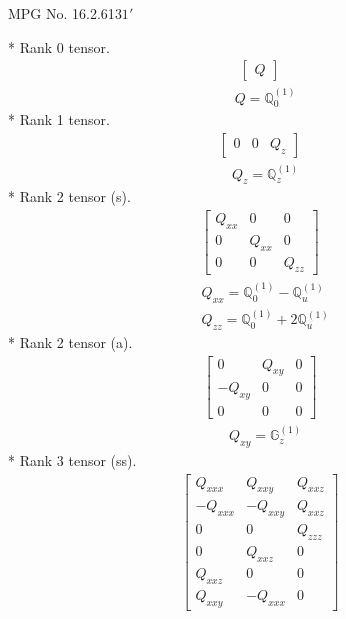\documentclass[fleqn,8pt,landscape]{jsarticle}
\begin{document}
\setcounter{MaxMatrixCols}{32}

\renewcommand{\tablename}{Table~}
\renewcommand{\figurename}{Figure~}
\begin{center}
\LARGE
MPG No. 16.2.61\quad$31'$
\end{center}
* Rank 0 tensor.
\begin{align*}
\begin{bmatrix} Q \end{bmatrix}
\end{align*}
\begin{align*}
& Q = \mathbb{Q}_{0}^{(1)}
\end{align*}
* Rank 1 tensor.
\begin{align*}
\begin{bmatrix} 0 & 0 & Q_{z} \end{bmatrix}
\end{align*}
\begin{align*}
& Q_{z} = \mathbb{Q}_{z}^{(1)}
\end{align*}
* Rank 2 tensor (s).
\begin{align*}
\begin{bmatrix} Q_{xx} & 0 & 0 \\ 0 & Q_{xx} & 0 \\ 0 & 0 & Q_{zz} \end{bmatrix}
\end{align*}
\begin{align*}
& Q_{xx} = \mathbb{Q}_{0}^{(1)} - \mathbb{Q}_{u}^{(1)} \\
& Q_{zz} = \mathbb{Q}_{0}^{(1)} + 2 \mathbb{Q}_{u}^{(1)}
\end{align*}
* Rank 2 tensor (a).
\begin{align*}
\begin{bmatrix} 0 & Q_{xy} & 0 \\ - Q_{xy} & 0 & 0 \\ 0 & 0 & 0 \end{bmatrix}
\end{align*}
\begin{align*}
& Q_{xy} = \mathbb{G}_{z}^{(1)}
\end{align*}
* Rank 3 tensor (ss).
\begin{align*}
\begin{bmatrix} Q_{xxx} & Q_{xxy} & Q_{xxz} \\ - Q_{xxx} & - Q_{xxy} & Q_{xxz} \\ 0 & 0 & Q_{zzz} \\ 0 & Q_{xxz} & 0 \\ Q_{xxz} & 0 & 0 \\ Q_{xxy} & - Q_{xxx} & 0 \end{bmatrix}
\end{align*}
\end{document}
